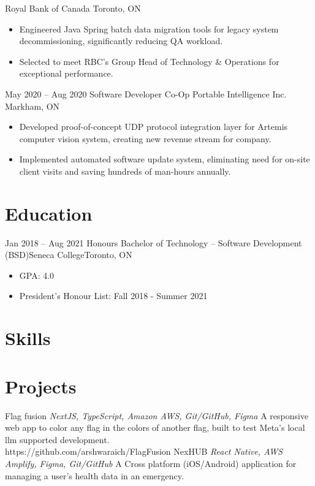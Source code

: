 \documentclass[letterpaper]{moderncv}
\begin{document}
{Royal Bank of Canada}
{Toronto, ON}
{}
{\begin{itemize}%
	\item Engineered Java Spring batch data migration tools for legacy system decommissioning, significantly reducing QA workload.
	\item Selected to meet RBC's Group Head of Technology \& Operations for exceptional performance.
	\end{itemize}}
\cventry
{May 2020 -- Aug 2020}
{Software Developer Co-Op}
{Portable Intelligence Inc.}
{Markham, ON}
{}
{\begin{itemize}%
	\item Developed proof-of-concept UDP protocol integration layer for Artemis computer vision system, creating new revenue stream for company.
	\item Implemented automated software update system, eliminating need for on-site client visits and saving hundreds of man-hours annually.
	\end{itemize}}

\section{Education}
\cventry
{Jan 2018 -- Aug 2021}
{Honours Bachelor of Technology – Software Development (BSD)}{Seneca College}{Toronto, ON}{}
{\begin{itemize}%
	\item GPA: 4.0
	\item President's Honour List: Fall 2018 - Summer 2021
	\end{itemize}}

\section{Skills}
\section{Projects}
\cventry
{}
{Flag fusion}
{}
{\textit{NextJS, TypeScript, Amazon AWS, Git/GitHub, Figma}}
{}
{A responsive web app to color any flag in the colors of another flag, built to test Meta's local llm supported development.\\https://github.com/arshwaraich/FlagFusion}
\vspace{1mm}
\cventry
{}
{NexHUB}
{}
{\textit{React Native, AWS Amplify, Figma, Git/GitHub}}
{}
{A Cross platform (iOS/Android) application for managing a user's health data in an emergency.}
\vspace{1mm}
\end{document}
